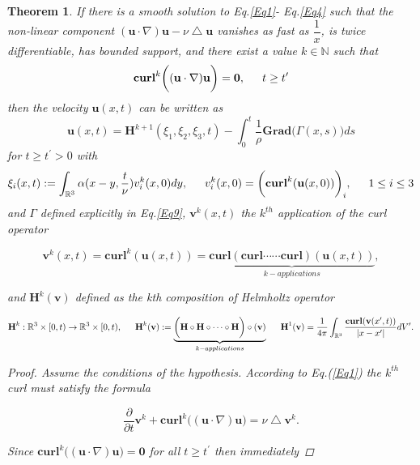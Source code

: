 \documentclass[amsmath,12pt,a4paper]{amsart}
\newtheorem{theorem}{Theorem}
\begin{document}
\begin{theorem}\label{Thm2}
If there is a smooth solution to Eq.\eqref{Eq1}- Eq.\eqref{Eq4} such that the non-linear component $\left(\textbf{u}\cdot \nabla \right)\textbf{u} -    \nu \bigtriangleup \textbf{u}$ vanishes as fast as $\dfrac{1}{x}$, is twice differentiable, has bounded support, and there exist a value $k\in \mathbb{N}$ such that $$\textbf{curl}^k\biggl((\textbf{u}\cdot \nabla)\textbf{u}\biggr)=\textbf{0}, \indent t\ge t^\prime$$ then the velocity $\textbf{u}(x,t)$ can be written as $$\textbf{u}(x,t) = \textbf{H}^{k+1}(\xi_1,\xi_2,\xi_3,t) -\int_{0}^{t}{\dfrac{1}{\rho}  \textbf{Grad}\big(\Gamma(x,s)\big)}ds$$ for $t\ge t^\prime>0$ with $$\xi_i(x,t):= \int_{\mathbb{R}^3}^{}{\alpha(x-y,\dfrac{t}{\nu})v^k_i(x,0)}dy, \indent v^k_i(x,0) = \biggl(\textbf{curl}^k(\textbf{u}(x,0))\biggr)_i, \indent 1\le i\le 3$$ and $\Gamma$ defined explicitly in Eq.\eqref{Eq9}, $\textbf{v}^k(x,t)$ the $k^{th}$ application of the curl operator 


\begin{equation}\nonumber
\textbf{v}^k(x,t) = \textbf{curl}^k(\textbf{u}(x,t)) = \underbrace{\textbf{curl}(\textbf{curl}\cdots \cdots \textbf{curl})(\textbf{u}(x,t))}_{k-applications},
\end{equation} 

and $\textbf{H}^k(\textbf{v})$ defined as the kth composition of Helmholtz operator 

\begin{equation}\nonumber
\textbf{H}^k:\mathbb{R}^3\times [0,t)\rightarrow \mathbb{R}^3 \times [0,t), \indent \textbf{H}^k(\textbf{v}) := \underbrace{\biggl(\textbf{H}\circ \textbf{H}\circ \cdots \circ \textbf{H}\biggr) \circ (\textbf{v})}_{k-applications} \indent  \textbf{H}^1(\textbf{v})  = \dfrac{1}{4\pi} \int_{\mathbb{R}^3}^{}{\dfrac{\textbf{curl}(\textbf{v}(x^\prime,t))}{|x-x^\prime|}}dV^\prime.
\end{equation} 




\begin{proof}
Assume the conditions of the hypothesis.  According to Eq.(\ref{Eq1}) the $k^{th}$ curl must satisfy the formula

\begin{equation}\label{Eq15}
\dfrac{\partial}{\partial t} \textbf{v}^k + \textbf{curl}^k\biggl(\left(\textbf{u}\cdot \nabla \right)\textbf{u}\biggr) = \nu \bigtriangleup \textbf{v}^k.
\end{equation}

Since $\textbf{curl}^k\biggl(\left(\textbf{u}\cdot \nabla \right)\textbf{u}\biggr) = \textbf{0}$  for all $t\ge t^\prime$ then immediately



\end{proof}
\end{theorem}
\end{document}
